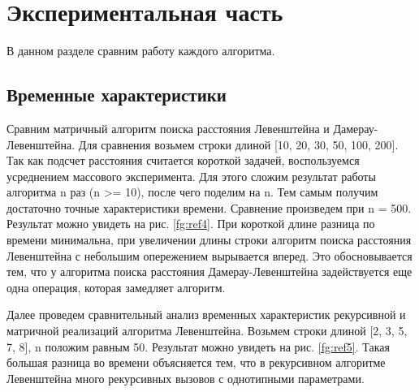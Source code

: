 \chapter{Экспериментальная часть}

В данном разделе сравним работу каждого алгоритма.

\section{Временные характеристики}

Сравним матричный алгоритм поиска расстояния Левенштейна и Дамерау-Левенштейна.
Для сравнения возьмем строки длиной [10, 20, 30, 50, 100, 200]. 
Так как подсчет расстояния считается короткой задачей, воспользуемся усреднением массового эксперимента. 
Для этого сложим результат работы алгоритма n раз (n >= 10), после чего поделим на n. 
Тем самым получим достаточно точные характеристики времени. 
Сравнение произведем при n = 500.
Результат можно увидеть на рис. \ref{fg:ref4}. При короткой длине разница по времени минимальна, при увеличении длины строки алгоритм поиска расстояния Левенштейна с небольшим опережением вырывается вперед. Это обосновывается тем, что у алгоритма поиска расстояния Дамерау-Левенштейна задействуется еще одна операция, которая замедляет алгоритм.

\begin{figure}[ht!]
\end{figure}

Далее проведем сравнительный анализ временных характеристик рекурсивной и матричной реализаций алгоритма Левенштейна. 
Возьмем строки длиной [2, 3, 5, 7, 8], n положим равным 50.
Результат можно увидеть на рис. \ref{fg:ref5}.
Такая большая разница во времени объясняется тем, что в рекурсивном алгоритме Левенштейна много рекурсивных вызовов с однотипными параметрами.

